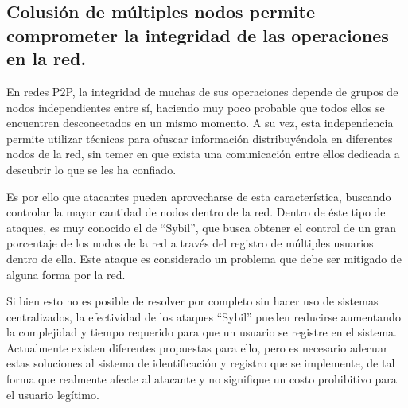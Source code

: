   \subsection{Colusión de múltiples nodos permite comprometer la integridad de las operaciones en la red.}
        
      En redes P2P, la integridad de muchas de sus operaciones depende de
      grupos de nodos independientes entre sí, haciendo muy poco probable que
      todos ellos se encuentren desconectados en un mismo momento. A su vez,
      esta independencia permite utilizar técnicas para ofuscar información
      distribuyéndola en diferentes nodos de la red, sin temer en que exista una
      comunicación entre ellos dedicada a descubrir lo que se les ha confiado.
      
      Es por ello que atacantes pueden aprovecharse de esta característica, buscando controlar
      la mayor cantidad de nodos dentro de la red.
      Dentro de éste tipo de ataques, es muy conocido el de ``Sybil'', que busca obtener el
      control de un gran porcentaje de los nodos de la red a través del registro de
      múltiples usuarios dentro de ella. Este ataque es considerado un problema que debe
      ser mitigado de alguna forma por la red.

      Si bien esto no es posible de resolver por completo sin hacer
      uso de sistemas centralizados, la efectividad de los ataques ``Sybil''
      pueden reducirse aumentando la complejidad y tiempo requerido para que un
      usuario se registre en el sistema. Actualmente existen diferentes
      propuestas para ello, pero es necesario adecuar estas
      soluciones  al sistema de identificación y registro que se implemente, de
      tal forma que realmente afecte al atacante y no signifique un costo prohibitivo
      para el usuario legítimo.
    
